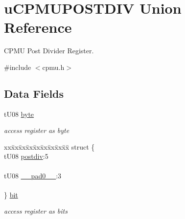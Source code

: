 \hypertarget{unionu_c_p_m_u_p_o_s_t_d_i_v}{}\section{u\+C\+P\+M\+U\+P\+O\+S\+T\+D\+I\+V Union Reference}
\label{unionu_c_p_m_u_p_o_s_t_d_i_v}


C\+P\+M\+U Post Divider Register.  




{\ttfamily \#include $<$cpmu.\+h$>$}

\subsection*{Data Fields}
\begin{DoxyCompactItemize}
\item 
\hypertarget{unionu_c_p_m_u_p_o_s_t_d_i_v_aba308d63db050aed25cfd36c37e41ad4}{}t\+U08 \hyperlink{unionu_c_p_m_u_p_o_s_t_d_i_v_aba308d63db050aed25cfd36c37e41ad4}{byte}\label{unionu_c_p_m_u_p_o_s_t_d_i_v_aba308d63db050aed25cfd36c37e41ad4}

\begin{DoxyCompactList}\small\item\em access register as byte \end{DoxyCompactList}\item 
\hypertarget{unionu_c_p_m_u_p_o_s_t_d_i_v_a3b1396eff34b85b75f034482f7ceba0f}{}\begin{tabbing}
xx\=xx\=xx\=xx\=xx\=xx\=xx\=xx\=xx\=\kill
struct \{\\
\>tU08 \hyperlink{unionu_c_p_m_u_p_o_s_t_d_i_v_af925586321b12cfea98aa4a8d3763138}{postdiv}:5\\
\>\\
\>tU08 \hyperlink{unionu_c_p_m_u_p_o_s_t_d_i_v_aa3e5250d311ceb1525f9adf38f0d7982}{\_\_pad0\_\_}:3\\
\>\\
\} \hyperlink{unionu_c_p_m_u_p_o_s_t_d_i_v_a3b1396eff34b85b75f034482f7ceba0f}{bit}\label{unionu_c_p_m_u_p_o_s_t_d_i_v_a3b1396eff34b85b75f034482f7ceba0f}
\\

\end{tabbing}\begin{DoxyCompactList}\small\item\em access register as bits \end{DoxyCompactList}\end{DoxyCompactItemize}


